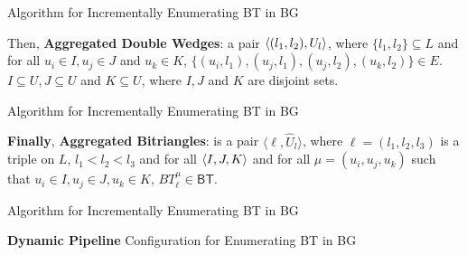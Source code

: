 \begin{frame}[fragile]{Algorithm for Incrementally Enumerating BT in BG}
  \begin{center}
    Then, \textbf{Aggregated Double Wedges}: a pair  $\left\langle (l_1, l_2), U_l \right\rangle$, where $\{l_1,l_2\}\subseteq L$ and  for all $u_i \in I, u_j \in J$ and $u_k \in K$, $\{(u_i, l_1), (u_j, l_1), (u_j, l_2), (u_k, l_2)\} \in E$.
    $I \subseteq U, J \subseteq U$ and $K \subseteq U$, where $I, J$ and $K$ are disjoint sets. 
  \end{center}    
  \begin{figure}
    \centering
  \end{figure}
\end{frame}

\begin{frame}[fragile]{Algorithm for Incrementally Enumerating BT in BG}
  \begin{center}
    \textbf{Finally}, \textbf{Aggregated Bitriangles}: is a pair  $\langle \ell, \hat{U}_l\rangle$, 
    where $\ell=(l_1, l_2, l_3)$ is a triple on $L$, $l_1 < l_2 < l_3$ and for all $\left\langle I, J, K\right\rangle$ and for all $\mu=(u_i, u_j, u_k)$ such that $u_i \in I, u_j \in J, u_k \in K$, $BT_{\ell}^{\mu} \in \mathsf{BT}$.
  \end{center}    
  \begin{figure}
    \centering
  \end{figure}
\end{frame}


\begin{frame}[fragile]{Algorithm for Incrementally Enumerating BT in BG}
  \begin{center}
    \textbf{Dynamic Pipeline} Configuration for Enumerating BT in BG
  \end{center}    
  \begin{figure}
    \centering  
  \end{figure}
  \begin{figure}
    \centering  
  \end{figure}
\end{frame}

